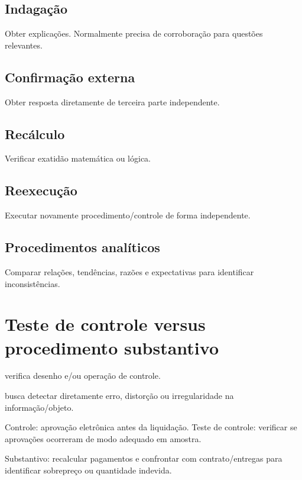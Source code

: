 \subsection{Indagação}

Obter explicações. Normalmente precisa de corroboração para questões relevantes.

\subsection{Confirmação externa}

Obter resposta diretamente de terceira parte independente.

\subsection{Recálculo}

Verificar exatidão matemática ou lógica.

\subsection{Reexecução}

Executar novamente procedimento/controle de forma independente.

\subsection{Procedimentos analíticos}

Comparar relações, tendências, razões e expectativas para identificar inconsistências.

\section{Teste de controle versus procedimento substantivo}

 verifica desenho e/ou operação de controle.

 busca detectar diretamente erro, distorção ou irregularidade na informação/objeto.

\begin{exemplo}[pagamento]
Controle: aprovação eletrônica antes da liquidação. Teste de controle: verificar se aprovações ocorreram de modo adequado em amostra.

Substantivo: recalcular pagamentos e confrontar com contrato/entregas para identificar sobrepreço ou quantidade indevida.
\end{exemplo}

